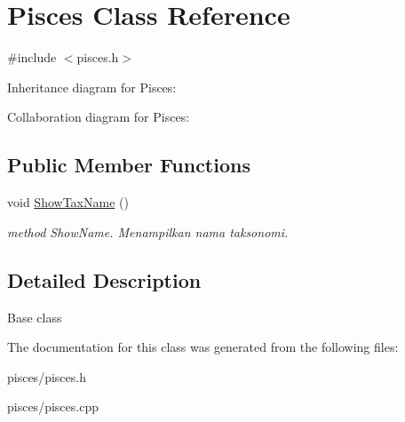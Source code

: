 \hypertarget{classPisces}{}\section{Pisces Class Reference}
\label{classPisces}


{\ttfamily \#include $<$pisces.\+h$>$}



Inheritance diagram for Pisces\+:


Collaboration diagram for Pisces\+:
\subsection*{Public Member Functions}
\begin{DoxyCompactItemize}
\item 
void \hyperlink{classPisces_ab12b83c0263c81c275f1372b4038c023}{Show\+Tax\+Name} ()\hypertarget{classPisces_ab12b83c0263c81c275f1372b4038c023}{}\label{classPisces_ab12b83c0263c81c275f1372b4038c023}

\begin{DoxyCompactList}\small\item\em method Show\+Name. Menampilkan nama taksonomi. \end{DoxyCompactList}\end{DoxyCompactItemize}


\subsection{Detailed Description}
Base class 

The documentation for this class was generated from the following files\+:\begin{DoxyCompactItemize}
\item 
pisces/pisces.\+h\item 
pisces/pisces.\+cpp\end{DoxyCompactItemize}
